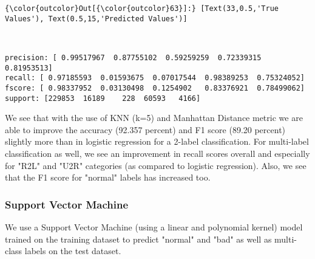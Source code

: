 \documentclass[11pt]{article}
\begin{document}
\begin{Verbatim}[commandchars=\\\{\}]
{\color{outcolor}Out[{\color{outcolor}63}]:} [Text(33,0.5,'True Values'), Text(0.5,15,'Predicted Values')]
\end{Verbatim}
            
    \begin{center}
    \end{center}
    { \hspace*{\fill} \\}
    
    \begin{Verbatim}[commandchars=\\\{\}]
precision: [ 0.99517967  0.87755102  0.59259259  0.72339315  0.81953513]
recall: [ 0.97185593  0.01593675  0.07017544  0.98389253  0.75324052]
fscore: [ 0.98337952  0.03130498  0.1254902   0.83376921  0.78499062]
support: [229853  16189    228  60593   4166]

    \end{Verbatim}

    We see that with the use of KNN (k=5) and Manhattan Distance metric we
are able to improve the accuracy (92.357 percent) and F1 score (89.20
percent) slightly more than in logistic regression for a 2-label
classification. For multi-label classification as well, we see an
improvement in recall scores overall and especially for "R2L" and "U2R"
categories (as compared to logistic regression). Also, we see that the
F1 score for "normal" labels has increased too.

    \subsubsection{Support Vector Machine}\label{support-vector-machine}

We use a Support Vector Machine (using a linear and polynomial kernel)
model trained on the training dataset to predict "normal" and "bad" as
well as multi-class labels on the test dataset.
\end{document}
